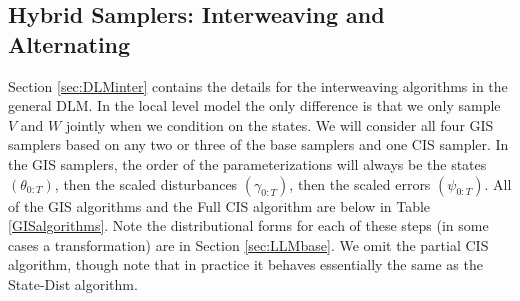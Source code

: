 \documentclass{article}
\begin{document}
\subsection{Hybrid Samplers: Interweaving and Alternating}
Section \ref{sec:DLMinter} contains the details for the interweaving algorithms in the general DLM. In the local level model the only difference is that we only sample $V$ and $W$ jointly when we condition on the states. We will consider all four GIS samplers based on any two or three of the base samplers and one CIS sampler. In the GIS samplers, the order of the parameterizations will always be the states $(\theta_{0:T})$, then the scaled disturbances $(\gamma_{0:T})$, then the scaled errors $(\psi_{0:T})$. All of the GIS algorithms and the Full CIS algorithm are below in Table \ref{GISalgorithms}. Note the distributional forms for each of these steps (in some cases a transformation) are in Section \ref{sec:LLMbase}. We omit the partial CIS algorithm, though note that in practice it behaves essentially the same as the State-Dist algorithm.
\end{document}

